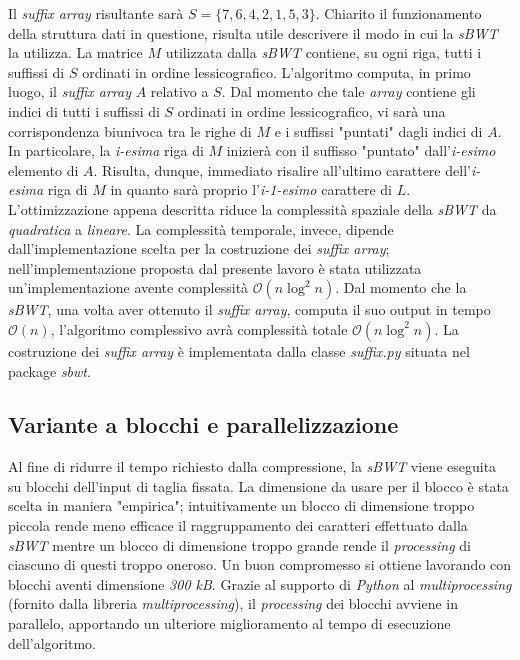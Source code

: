 Il \emph{suffix array} risultante sarà $S=\{7, 6, 4, 2, 1, 5, 3\}$. Chiarito il funzionamento della struttura dati in questione, risulta utile descrivere il modo in cui la \emph{sBWT} la utilizza. La matrice $M$ utilizzata dalla \emph{sBWT} contiene, su ogni riga, tutti i suffissi di $S$ ordinati in ordine lessicografico. L'algoritmo computa, in primo luogo, il \emph{suffix array} $A$ relativo a $S$. Dal momento che tale \emph{array} contiene gli indici di tutti i suffissi di $S$ ordinati in ordine lessicografico, vi sarà una corrispondenza biunivoca tra le righe di $M$ e i suffissi "puntati" dagli indici di $A$. In particolare, la \emph{i-esima} riga di $M$ inizierà con il suffisso "puntato" dall'\emph{i-esimo} elemento di $A$. Risulta, dunque, immediato risalire all'ultimo carattere dell'\emph{i-esima} riga di $M$ in quanto sarà proprio l'\emph{i-1-esimo} carattere di $L$. \\ L'ottimizzazione appena descritta riduce la complessità spaziale della \emph{sBWT} da \emph{quadratica} a \emph{lineare}. La complessità temporale, invece, dipende dall'implementazione scelta per la costruzione dei \emph{suffix array}; nell'implementazione proposta dal presente lavoro è stata utilizzata un'implementazione avente complessità $\mathcal{O}(n\log^2{}n)$. Dal momento che la \emph{sBWT}, una volta aver ottenuto il \emph{suffix array}, computa il suo output in tempo $\mathcal{O}(n)$, l'algoritmo complessivo avrà complessità totale $\mathcal{O}(n\log^2{}n)$. La costruzione dei \emph{suffix array} è implementata dalla classe \emph{suffix.py} situata nel package \emph{sbwt}.
\subsection{Variante a blocchi e parallelizzazione}
Al fine di ridurre il tempo richiesto dalla compressione, la \emph{sBWT} viene eseguita su blocchi dell'input di taglia fissata. La dimensione da usare per il blocco è stata scelta in maniera "empirica"; intuitivamente un blocco di dimensione troppo piccola rende meno efficace il raggruppamento dei caratteri effettuato dalla \emph{sBWT} mentre un blocco di dimensione troppo grande rende il \emph{processing} di ciascuno di questi troppo oneroso. Un buon compromesso si ottiene lavorando con blocchi aventi dimensione \emph{300 kB}. Grazie al supporto di \emph{Python} al \emph{multiprocessing} (fornito dalla libreria \emph{multiprocessing}), il \emph{processing} dei blocchi avviene in parallelo, apportando un ulteriore miglioramento al tempo di esecuzione dell'algoritmo.
